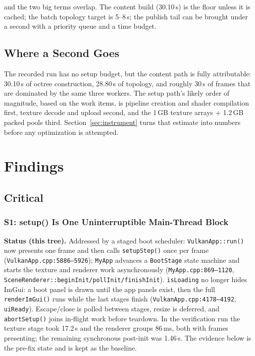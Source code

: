 \documentclass[11pt,a4paper]{article}
\begin{document}
and the two big terms overlap. The content build (30.10\,s) is the floor
unless it is cached; the batch topology target is 5--8\,s; the publish tail
can be brought under a second with a priority queue and a time budget.

\subsection{Where a Second Goes}

The recorded run has no setup budget, but the content path is fully
attributable: 30.10\,s of octree construction, 28.80\,s of topology, and
roughly 30\,s of frames that are dominated by the same three workers. The
setup path's likely order of magnitude, based on the work items, is pipeline
creation and shader compilation first, texture decode and upload second, and
the 1\,GB texture arrays + 1.2\,GB packed pools third. Section~\ref{sec:instrument}
turns that estimate into numbers before any optimization is attempted.

\section{Findings}

\subsection{Critical}

\subsubsection*{S1: setup() Is One Uninterruptible Main-Thread Block}

\textbf{Status (this tree).} Addressed by a staged boot scheduler:
\texttt{VulkanApp::run()} now presents one frame and then calls
\texttt{setupStep()} once per frame (\texttt{VulkanApp.cpp:5886--5926});
\texttt{MyApp} advances a \texttt{BootStage} state machine and starts the
texture and renderer work asynchronously
(\texttt{MyApp.cpp:869--1120},
\texttt{SceneRenderer::beginInit/pollInit/finishInit}). \texttt{isLoading} no longer hides ImGui: a boot panel is drawn
until the app panels exist, then the full \texttt{renderImGui()} runs while
the last stages finish (\texttt{VulkanApp.cpp:4178--4192}, \texttt{uiReady}).
Escape/close is polled between stages, resize is deferred, and
\texttt{abortSetup()} joins in-flight work before teardown. In the verification
run the texture stage took 17.2\,s and the renderer groups 86\,ms, both with
frames presenting; the remaining synchronous post-init was 1.46\,s. The
evidence below is the pre-fix state and is kept as the baseline.
\end{document}

